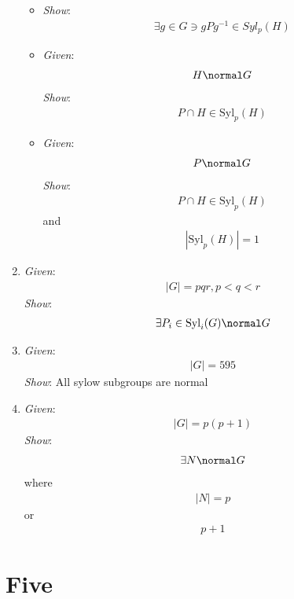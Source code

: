 \begin{enumerate}
  \begin{itemize}
  \tightlist
  \item
    \emph{Show}: \begin{align*}
    \exists g \in G \ni gPg^{-1} \in Syl_p(H)\end{align*}
  \item
    \emph{Given}: \begin{align*}
    H \normal G\end{align*}
     \emph{Show}: \begin{align*}
    P\cap H \in \text{Syl}_p(H)\end{align*}
  \item
    \emph{Given}: \begin{align*}
    P \normal G\end{align*}
     \emph{Show}: \begin{align*}
    P \cap H \in \text{Syl}_p(H)\end{align*}
     and \begin{align*}
    |\text{Syl}_p(H)| = 1\end{align*}
  \end{itemize}
\item
  \emph{Given}: \begin{align*}
  |G| = pqr, p < q < r\end{align*}
   \emph{Show}: \begin{align*}
  \exists P_i \in \text{Syl}_i(G) \normal G\end{align*}
\item
  \emph{Given}: \begin{align*}
  |G| =595\end{align*}
   \emph{Show}: All sylow subgroups are normal
\item
  \emph{Given}: \begin{align*}
  |G| = p(p+1)\end{align*}
   \emph{Show}: \begin{align*}
  \exists N \normal G\end{align*}
   where \begin{align*}
  |N| = p\end{align*}
   or \begin{align*}
  p+1\end{align*}
\end{enumerate}

\hypertarget{five}{%
\section{Five}\label{five}}

